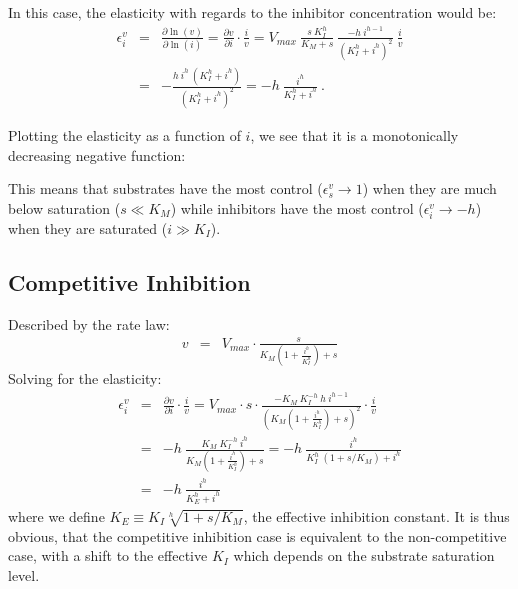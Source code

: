 \documentclass[12pt,a4paper]{article}
\begin{document}
In this case, the elasticity with regards to the inhibitor concentration would be:
\begin{eqnarray}
    \epsilon_i^v &=& \frac{\partial \ln(v)}{\partial \ln(i)} = \frac{\partial v}{\partial i}\cdot\frac{i}{v} = V_{max} ~ \frac{s ~ K_I^h}{K_M + s} ~ \frac{- h ~ i^{h-1}}{(K_I^h + i^h)^2} ~ \frac{i}{v} \nonumber \\
    &=& -\frac{h ~ i^h ~ (K_I^h + i^h)}{(K_I^h + i^h)^2} = -h ~ \frac{i^h}{K_I^h + i^h}~.
\end{eqnarray}

Plotting the elasticity as a function of $i$, we see that it is a monotonically decreasing negative function:


This means that substrates have the most control ($\epsilon_s^v \rightarrow 1$) when they are much below saturation ($s \ll K_M$) while inhibitors have the most control ($\epsilon_i^v \rightarrow -h$) when they are saturated ($i \gg K_I$).


\subsection{Competitive Inhibition}
Described by the rate law:
\begin{eqnarray}
    v &=& V_{max} \cdot \frac{s}{K_M \left(1 + \frac{i^h}{K_I^h}\right) + s}
\end{eqnarray}
Solving for the elasticity:
\begin{eqnarray}
    \epsilon_i^v &=& \frac{\partial v}{\partial i}\cdot\frac{i}{v} = V_{max} \cdot s \cdot \frac{-K_M ~ K_I^{-h} ~ h~i^{h-1}}{\left(K_M \left(1 + \frac{i^h}{K_I^h}\right) + s\right)^2} \cdot \frac{i}{v} \nonumber \\
    &=& -h~\frac{K_M ~ K_I^{-h} ~ i^h}{K_M \left(1 + \frac{i^h}{K_I^h}\right) + s} =
        -h~\frac{i^h}{K_I^h ~ (1 + s / K_M) + i^h} \nonumber \\
    &=& -h~\frac{i^h}{K_E^h + i^h}
\end{eqnarray}
where we define $K_E \equiv K_I \sqrt[h]{1 + s/K_M}$, the effective inhibition constant. It is thus obvious, that the competitive inhibition case is equivalent to the non-competitive case, with a shift to the effective $K_I$ which depends on the substrate saturation level.
\end{document}
